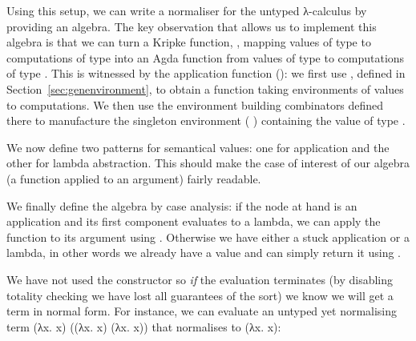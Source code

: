 \begin{agdasnippet}
\end{agdasnippet}

Using this setup, we can write a normaliser for the untyped λ-calculus
by providing an algebra. The key observation that allows us to implement
this algebra is that we can turn a Kripke function, , mapping values
of type  to computations of type  into an Agda function from
values of type  to computations of type . This is witnessed
by the application function (\AF{\_\$\$\_}):
we first use , defined in Section~\ref{sec:genenvironment}, to obtain
a function taking environments of values to computations. We then use the environment building
combinators defined there to manufacture the singleton
environment {(  )} containing the value  of type
.

\begin{agdasnippet}[h]
\end{agdasnippet}

We now define two patterns for semantical values: one for application and
the other for lambda abstraction. This should make the case of interest of
our algebra (a function applied to an argument) fairly readable.

\begin{agdasnippet}
\end{agdasnippet}

We finally define the algebra by case analysis: if the node at hand is an
application and its first component evaluates to a lambda, we can apply
the function to its argument using \AF{\_\$\$\_}. Otherwise we have either a
stuck application or a lambda, in other words we already have a value and can
simply return it using .

\begin{agdasnippet}
\end{agdasnippet}

We have not used the  constructor so \emph{if} the evaluation terminates
(by disabling totality checking we have lost all guarantees of the sort) we know
we will get a term in normal form. For instance, we can evaluate an untyped yet normalising
term {(λx. x) ((λx. x) (λx. x))} that normalises to {(λx. x)}:

\begin{agdasnippet}
\end{agdasnippet}
